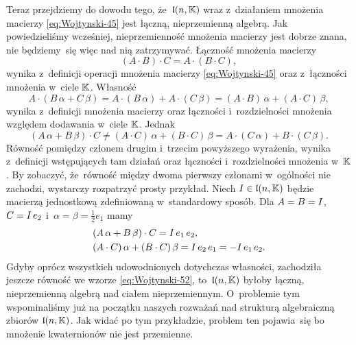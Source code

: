 \documentclass[a4paper,11pt]{article}
\begin{document}
Teraz przejdziemy do dowodu tego, że~$\mathfrak{l}( n, \mathbb{K} )$ wraz z~działaniem
mnożenia macierzy \eqref{eq:Wojtynski-45} jest łączną, nieprzemienną
algebrą. Jak powiedzieliśmy wcześniej, nieprzemienność mnożenia macierzy
jest dobrze znana, nie będziemy~się więc nad nią zatrzymywać. Łączność
mnożenia macierzy
\begin{equation}
  \label{eq:Wojtynski-50}
  ( A \cdot B ) \cdot C = A \cdot ( B \cdot C ),
\end{equation}
wynika z~definicji operacji mnożenia macierzy \eqref{eq:Wojtynski-45} oraz
z~łączności mnożenia w~ciele $\mathbb{K}$. Własność
\begin{equation}
  \label{eq:Wojtynski-51}
  A \cdot ( B \, \alpha + C \, \beta ) = A \cdot ( B \, \alpha ) + A \cdot ( C \, \beta ) =
  ( A \cdot B ) \, \alpha + ( A \cdot C ) \, \beta,
\end{equation}
wynika z~definicji mnożenia macierzy oraz łączności i~rozdzielności
mnożenia względem dodawania w~ciele $\mathbb{K}$. Jednak
\begin{equation}
  \label{eq:Wojtynski-52}
  ( A \, \alpha + B \, \beta ) \cdot C \neq
  ( A \cdot C ) \, \alpha + ( B \cdot C ) \, \beta =
  A \cdot ( C \, \alpha ) + B \cdot ( C \, \beta ).
\end{equation}
Równość pomiędzy członem drugim i~trzecim powyższego wyrażenia, wynika
z~definicji wstępujących tam działań oraz łączności i~rozdzielności
mnożenia w~$\mathbb{K}$. By zobaczyć, że~równość między dwoma pierwszy członami
w~ogólności nie zachodzi, wystarczy rozpatrzyć prosty przykład. Niech
$I \in \mathfrak{l}( n, \mathbb{K} )$ będzie macierzą jednostkową zdefiniowaną
w~standardowy sposób. Dla $A = B = I$, $C = I \, e_{ 2 }$
i~$\alpha = \beta = \frac{ 1 }{ 2 } e_{ 1 }$ mamy
\begin{subequations}
  \begin{align}
    \label{eq:Wojtynski-53-A}
    &( A \, \alpha + B \, \beta ) \cdot C = I \, e_{ 1 } \, e_{ 2 }, \\
    \label{eq:Wojtynski-53-B}
    &( A \cdot C ) \, \alpha + ( B \cdot C ) \, \beta = I \, e_{ 2 } \, e_{ 1 } =
      -I \, e_{ 1 } \, e_{ 2 }.
  \end{align}
\end{subequations}
Gdyby oprócz wszystkich udowodnionych dotychczas własności, zachodziła
jeszcze równość we wzorze \eqref{eq:Wojtynski-52}, to~$\mathfrak{l}( n, \mathbb{K} )$
byłoby łączną, nieprzemienną algebrą nad ciałem nieprzemiennym.
O~problemie tym wspominaliśmy już na początku naszych rozważań nad
strukturą algebraiczną zbiorów $\mathfrak{l}( n, \mathbb{K} )$. Jak widać po tym
przykładzie, problem ten pojawia~się bo mnożenie kwaternionów nie jest
przemienne.
\end{document}
